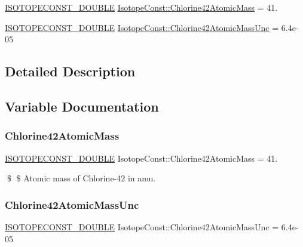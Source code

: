 \begin{DoxyCompactItemize}
\item 
\mbox{\hyperlink{group___isotope_const-_macros_ga8f45a7272ce02c0b4c65c44636ed719a}{I\+S\+O\+T\+O\+P\+E\+C\+O\+N\+S\+T\+\_\+\+D\+O\+U\+B\+LE}} \mbox{\hyperlink{group___isotope_const-_chlorine-_cl42_ga7abfb0ed92fd90464e2e2d3da7a583f7}{Isotope\+Const\+::\+Chlorine42\+Atomic\+Mass}} = 41.
\item 
\mbox{\hyperlink{group___isotope_const-_macros_ga8f45a7272ce02c0b4c65c44636ed719a}{I\+S\+O\+T\+O\+P\+E\+C\+O\+N\+S\+T\+\_\+\+D\+O\+U\+B\+LE}} \mbox{\hyperlink{group___isotope_const-_chlorine-_cl42_ga0b9528b7482a1f38b677969528e1c294}{Isotope\+Const\+::\+Chlorine42\+Atomic\+Mass\+Unc}} = 6.\+4e-\/05
\end{DoxyCompactItemize}


\subsection{Detailed Description}


\subsection{Variable Documentation}
\mbox{\label{group___isotope_const-_chlorine-_cl42_ga7abfb0ed92fd90464e2e2d3da7a583f7}} 
\subsubsection{\texorpdfstring{Chlorine42\+Atomic\+Mass}{Chlorine42AtomicMass}}
{\footnotesize\ttfamily \mbox{\hyperlink{group___isotope_const-_macros_ga8f45a7272ce02c0b4c65c44636ed719a}{I\+S\+O\+T\+O\+P\+E\+C\+O\+N\+S\+T\+\_\+\+D\+O\+U\+B\+LE}} Isotope\+Const\+::\+Chlorine42\+Atomic\+Mass = 41.}

\$ \$ Atomic mass of Chlorine-\/42 in amu. \mbox{\label{group___isotope_const-_chlorine-_cl42_ga0b9528b7482a1f38b677969528e1c294}} 
\subsubsection{\texorpdfstring{Chlorine42\+Atomic\+Mass\+Unc}{Chlorine42AtomicMassUnc}}
{\footnotesize\ttfamily \mbox{\hyperlink{group___isotope_const-_macros_ga8f45a7272ce02c0b4c65c44636ed719a}{I\+S\+O\+T\+O\+P\+E\+C\+O\+N\+S\+T\+\_\+\+D\+O\+U\+B\+LE}} Isotope\+Const\+::\+Chlorine42\+Atomic\+Mass\+Unc = 6.\+4e-\/05}

